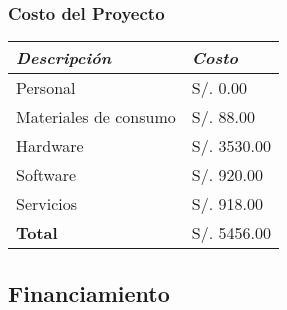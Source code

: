     \subsubsection{Costo del Proyecto}
        \begin{table}[h!]
            \centering
            \begin{tabular}{|p{5cm}|p{4cm}|} \hline


                \textit{{\bf{Descripción}}} &
                \textit{{\bf{Costo}}}
                \\ \hline

                Personal &
                S/. 0.00
                \\ \hline

                Materiales de consumo &
                S/. 88.00
                \\ \hline

                Hardware &
                S/. 3530.00
                \\ \hline

                Software &
                S/. 920.00
                \\ \hline

                Servicios &
                S/. 918.00
                \\ \hline

                \bf{Total} &
                S/. 5456.00
                \\ \hline

            \end{tabular}
        \end{table}

\subsection{Financiamiento}
